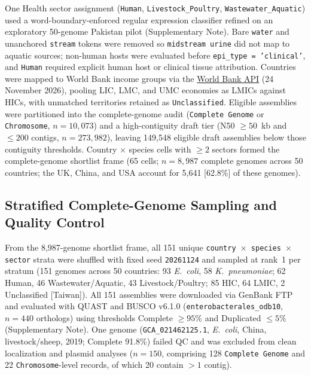 \documentclass[11pt,a4paper]{article}
\begin{document}
One Health sector assignment (\texttt{Human}, \texttt{Livestock\_Poultry}, \texttt{Wastewater\_Aquatic}) used a word-boundary-enforced regular expression classifier refined on an exploratory 50-genome Pakistan pilot (Supplementary Note). Bare \texttt{water} and unanchored \texttt{stream} tokens were removed so \texttt{midstream urine} did not map to aquatic sources; non-human hosts were evaluated before \texttt{epi\_type = 'clinical'}, and \texttt{Human} required explicit human host or clinical tissue attribution. Countries were mapped to World Bank income groups via the \href{https://api.worldbank.org/v2/country/all?format=json&per_page=300}{World Bank API} (24 November 2026), pooling LIC, LMC, and UMC economies as LMICs against HICs, with unmatched territories retained as \texttt{Unclassified}. Eligible assemblies were partitioned into the complete-genome audit (\texttt{Complete Genome} or \texttt{Chromosome}, $n = 10{,}073$) and a high-contiguity draft tier (N50 $\ge 50$~kb and $\le 200$ contigs, $n = 273{,}982$), leaving 149,548 eligible draft assemblies below those contiguity thresholds. Country $\times$ species cells with $\ge 2$ sectors formed the complete-genome shortlist frame (65 cells; $n = 8{,}987$ complete genomes across 50 countries; the UK, China, and USA account for 5,641 [62.8\%] of these genomes).

\subsection{Stratified Complete-Genome Sampling and Quality Control}

From the 8,987-genome shortlist frame, all 151 unique \texttt{country $\times$ species $\times$ sector} strata were shuffled with fixed seed \texttt{20261124} and sampled at rank~1 per stratum (151 genomes across 50 countries: 93 \textit{E.~coli}, 58 \textit{K.~pneumoniae}; 62 Human, 46 Wastewater/Aquatic, 43 Livestock/Poultry; 85 HIC, 64 LMIC, 2 Unclassified [Taiwan]). All 151 assemblies were downloaded via GenBank FTP and evaluated with QUAST \cite{gurevich2013} and BUSCO v6.1.0 (\texttt{enterobacterales\_odb10}, $n = 440$ orthologs) \cite{manni2021} using thresholds Complete $\ge 95\%$ and Duplicated $\le 5\%$ (Supplementary Note). One genome (\texttt{GCA\_021462125.1}, \textit{E.~coli}, China, livestock/sheep, 2019; Complete 91.8\%) failed QC and was excluded from clean localization and plasmid analyses ($n = 150$, comprising 128 \texttt{Complete Genome} and 22 \texttt{Chromosome}-level records, of which 20 contain $>1$ contig).
\end{document}
